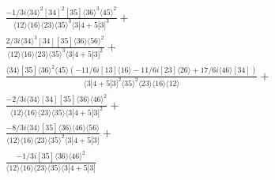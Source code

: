 \documentclass[varwidth, border=5pt]{standalone}
\begin{document}
\begin{my}
$\begin{gathered}
\scriptscriptstyle\frac{-1/3i\langle34\rangle^2[34]^2[35]\langle36\rangle^3\langle45\rangle^2}{\langle12\rangle\langle16\rangle\langle23\rangle\langle35\rangle^3\langle3|4+5|3]^3}+\\
\scriptscriptstyle\frac{2/3i\langle34\rangle^3[34][35]\langle36\rangle\langle56\rangle^2}{\langle12\rangle\langle16\rangle\langle23\rangle\langle35\rangle^3\langle3|4+5|3]^2}+\\
\scriptscriptstyle\frac{\langle34\rangle[35]\langle36\rangle^2\langle45\rangle(-11/6i[13]\langle16\rangle-11/6i[23]\langle26\rangle+17/6i\langle46\rangle[34])}{\langle3|4+5|3]^2\langle35\rangle^2\langle23\rangle\langle16\rangle\langle12\rangle}+\\
\scriptscriptstyle\frac{-2/3i\langle34\rangle[34][35]\langle36\rangle\langle46\rangle^2}{\langle12\rangle\langle16\rangle\langle23\rangle\langle35\rangle\langle3|4+5|3]^2}+\\
\scriptscriptstyle\frac{-8/3i\langle34\rangle[35]\langle36\rangle\langle46\rangle\langle56\rangle}{\langle12\rangle\langle16\rangle\langle23\rangle\langle35\rangle^2\langle3|4+5|3]}+\\
\scriptscriptstyle\frac{-1/3i[35]\langle36\rangle\langle46\rangle^2}{\langle12\rangle\langle16\rangle\langle23\rangle\langle35\rangle\langle3|4+5|3]}\phantom{+}
\end{gathered}$
\end{my}
\end{document}

